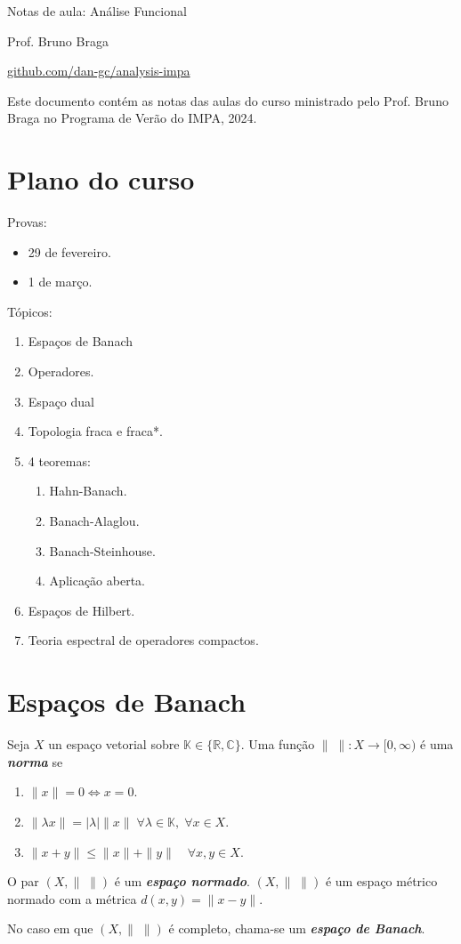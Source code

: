 \documentclass[portuguese]{article}
\theoremstyle{definition}
\newcommand{\R}{\mathbb{R}}
\newcommand{\C}{\mathbb{C}}
\begin{document}
	\begin{center}
		{\LARGE Notas de aula: Análise Funcional}
		
		{\Large Prof. Bruno Braga}
		
		 \href{https://github.com/dan-gc/analysis-impa}{github.com/dan-gc/analysis-impa}
		
	\end{center}
	Este documento contém as notas das aulas do curso ministrado pelo Prof. Bruno Braga no Programa de Verão do IMPA, 2024.
	\tableofcontents
	\section*{Plano do curso}
	Provas:
	\begin{itemize}
		\item 29 de fevereiro.
		\item 1 de março.
	\end{itemize}
	Tópicos:
	\begin{enumerate}
		\item Espaços de Banach
		\item Operadores.
		\item Espaço dual
		\item Topologia fraca e fraca*.
		\item 4 teoremas:
		\begin{enumerate}
			\item Hahn-Banach.
			\item Banach-Alaglou.
			\item Banach-Steinhouse.
			\item Aplicação aberta.
		\end{enumerate}
		\item Espaços de Hilbert.
		\item Teoria espectral de operadores compactos.
	\end{enumerate}
	
	\section{Espaços de Banach}
	\begin{defn}
		Seja $X$ un espaço vetorial sobre $\mathbb{K}\in\{\R,\C\}$. Uma função $\|\; \|:X\to[0,\infty)$ é uma \textbf{\textit{norma}} se
		\begin{enumerate}
			\item $\| x\|=0\iff x=0$.
			\item $\|\lambda x\|=|\lambda|\| x\|\;\forall\lambda\in\mathbb{K},\;\forall x\in X$.
			\item $\| x+y\|\leq\| x\|+\| y\|\quad\forall x,y\in X$.
		\end{enumerate}
		O par $(X,\|\;\|)$ é um \textbf{\textit{espaço normado}}. $(X,\|\;\|)$ é um espaço métrico normado com a métrica $d(x,y)=\| x-y\|$.
		
		No caso em que $(X,\|\;\|)$ é completo, chama-se um \textbf{\textit{espaço de Banach}}.
	\end{defn}
	
\end{document}
